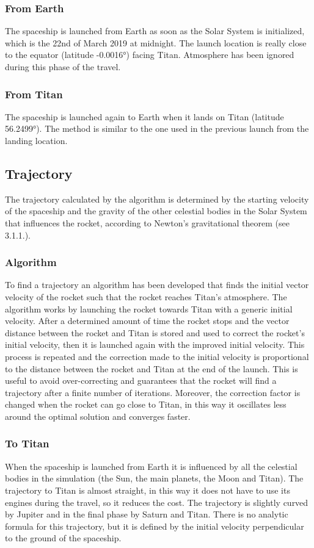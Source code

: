 \documentclass[10pt,a4paper]{article}
\begin{document}
	\subsubsection{From Earth}
	The spaceship is launched from Earth as soon as the Solar System is initialized, which is the 22nd of March 2019 at midnight. The launch location is really close to the equator (latitude -0.0016°) facing Titan. Atmosphere has been ignored during this phase of the travel.
	
	\subsubsection{From Titan}
	The spaceship is launched again to Earth when it lands on Titan (latitude 56.2499°). The method is similar to the one used in the previous launch from the landing location.
	
	\subsection{Trajectory}
	The trajectory calculated by the algorithm is determined by the starting velocity of the spaceship and the gravity of the other celestial bodies in the Solar System that influences the rocket, according to Newton's gravitational theorem (see 3.1.1.).
	
	
	\subsubsection{Algorithm}
	To find a trajectory an algorithm has been developed that finds the initial vector velocity of the rocket such that the rocket reaches Titan's atmosphere. The algorithm works by launching the rocket towards Titan with a generic initial velocity. After a determined amount of time the rocket stops and the vector distance between the rocket and Titan is stored and used to correct the rocket's initial velocity, then it is launched again with the improved initial velocity. This process is repeated and the correction made to the initial velocity is proportional to the distance between the rocket and Titan at the end of the launch. This is useful to avoid over-correcting and guarantees that the rocket will find a trajectory after a finite number of iterations. Moreover, the correction factor is changed when the rocket can go close to Titan, in this way it oscillates less around the optimal solution and converges faster.
	
	
	\subsubsection{To Titan}
	When the spaceship is launched from Earth it is influenced by all the celestial bodies in the simulation (the Sun, the main planets, the Moon and Titan). The trajectory to Titan is almost straight, in this way it does not have to use its engines during the travel, so it reduces the cost. The trajectory is slightly curved by Jupiter and in the final phase by Saturn and Titan. There is no analytic formula for this trajectory, but it is defined by the initial velocity perpendicular to the ground of the spaceship.\\
	
\end{document}
